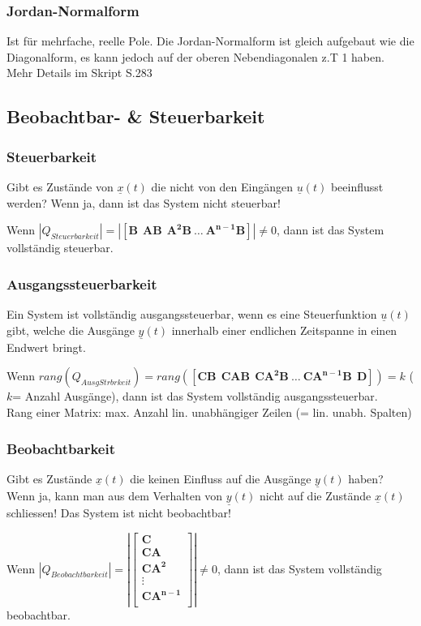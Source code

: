 \begin{multicols}{2}
\columnbreak

\subsubsection{Jordan-Normalform}
  Ist für mehrfache, reelle Pole. Die Jordan-Normalform ist gleich aufgebaut wie die Diagonalform, 
  es kann jedoch auf der oberen Nebendiagonalen z.T 1 haben. \\
  Mehr Details im Skript S.283
\end{multicols}


\subsection{Beobachtbar- \& Steuerbarkeit }
\subsubsection{Steuerbarkeit }
Gibt es Zustände von $\underline{x} (t)$ die nicht von den
Eingängen $\underline{u} (t)$ beeinflusst werden? Wenn ja,
dann ist das System nicht steuerbar!

Wenn $|Q_{Steuerbarkeit}|= \left| \left [ \boldsymbol{B~~AB~~ A^2B~\ldots~
A^{n-1}B} \right ] \right|  \neq 0$, dann ist das System vollständig steuerbar.

\subsubsection{Ausgangssteuerbarkeit}
Ein System ist vollständig ausgangssteuerbar, wenn es eine Steuerfunktion $\underline{u} (t)$ gibt,
welche die Ausgänge $\underline{y}(t)$ innerhalb einer endlichen Zeitspanne in einen Endwert bringt.

Wenn $rang(Q_{AusgStrbrkeit}) = rang \left( \left [ \boldsymbol{CB~~ CAB~~ CA^2B~\ldots~
CA^{n-1}B ~~ D}\right ] \right) = k$ ($k$= Anzahl Ausgänge), dann ist das System vollständig ausgangssteuerbar. \\
Rang einer Matrix: max. Anzahl lin. unabhängiger Zeilen (= lin. unabh. Spalten)

\subsubsection{Beobachtbarkeit }
Gibt es Zustände $\underline{x}(t)$ die keinen Einfluss auf die Ausgänge
$\underline{y}(t)$ haben? Wenn ja, kann man aus dem Verhalten von 
$\underline{y}(t)$ nicht auf die Zustände $\underline{x}(t)$ schliessen!
Das System ist nicht beobachtbar!


Wenn $|Q_{Beobachtbarkeit}| = \left| \left [ \boldsymbol{
\begin{array}{c}
 C\\
 CA\\
CA^2\\
\vdots \\
CA^{n-1}\\
\end{array}}\right ] \right| \neq 0$, dann ist das System vollständig
beobachtbar.

